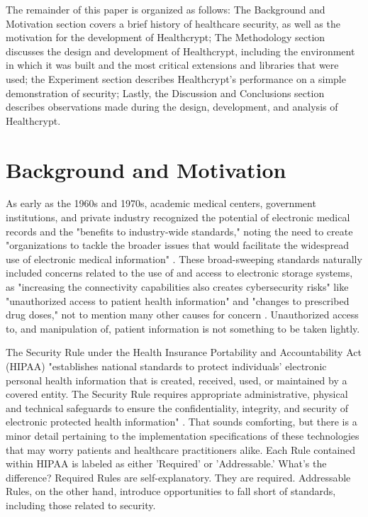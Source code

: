 \documentclass[letterpaper, 10pt,DIV=13]{scrartcl}
\begin{document}
\begin{multicols}{2}
\begin{spacing}{1.25}
The remainder of this paper is organized as follows: The Background and Motivation section covers a brief history of healthcare security, as well as the motivation for the development of Healthcrypt; The Methodology section discusses the design and development of Healthcrypt, including the environment in which it was built and the most critical extensions and libraries that were used; the Experiment section describes Healthcrypt's performance on a simple demonstration of security; Lastly, the Discussion and Conclusions section describes observations made during the design, development, and analysis of Healthcrypt.
\end{spacing}

\vspace{-2.5pt}

\section*{Background and Motivation}
\begin{spacing}{1.25}
As early as the 1960s and 1970s, academic medical centers, government institutions, and private industry recognized the potential of electronic medical records and the "benefits to industry-wide standards," noting the need to create "organizations to tackle the broader issues that would facilitate the widespread use of electronic medical information" \cite{ehrhistory2011}. These broad-sweeping standards naturally included concerns related to the use of and access to electronic storage systems, as "increasing the connectivity capabilities also creates cybersecurity risks" like "unauthorized access to patient health information" and "changes to prescribed drug doses," not to mention many other causes for concern \cite{nistitl2017}. Unauthorized access to, and manipulation of, patient information is not something to be taken lightly.

The Security Rule under the Health Insurance Portability and Accountability Act (HIPAA) "establishes national standards to protect individuals’ electronic personal health information that is created, received, used, or maintained by a covered entity. The Security Rule requires appropriate administrative, physical and technical safeguards to ensure the confidentiality, integrity, and security of electronic protected health information" \cite{hippaprof2017}. That sounds comforting, but there is a minor detail pertaining to the implementation specifications of these technologies that may worry patients and healthcare practitioners alike. Each Rule contained within HIPAA is labeled as either 'Required' or 'Addressable.' What's the difference? Required Rules are self-explanatory. They are required. Addressable Rules, on the other hand, introduce opportunities to fall short of standards, including those related to security.


\end{spacing}
\end{multicols}
\end{document}
